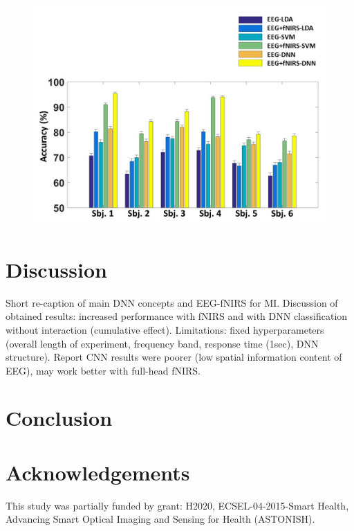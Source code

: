 \documentclass[12pt ]{iopart}
\begin{document}
\begin{figure}
	\includegraphics[width=\linewidth]{Diapositiva6.JPG}
	\caption{}
	\label{fig:fig6}
\end{figure}
\section{Discussion}
Short re-caption of main DNN concepts and EEG-fNIRS for MI.
Discussion of obtained results:
increased performance with fNIRS and with DNN classification without interaction (cumulative effect).
Limitations: fixed hyperparameters
(overall length of experiment, frequency band, response time (1sec), DNN structure). 
Report CNN results were poorer (low spatial information content of EEG), may work better with full-head fNIRS.






\section{Conclusion}

\section{Acknowledgements}
This study was partially funded by grant: H2020, ECSEL-04-2015-Smart Health, Advancing Smart Optical Imaging and Sensing for Health (ASTONISH).
 
\end{document}
